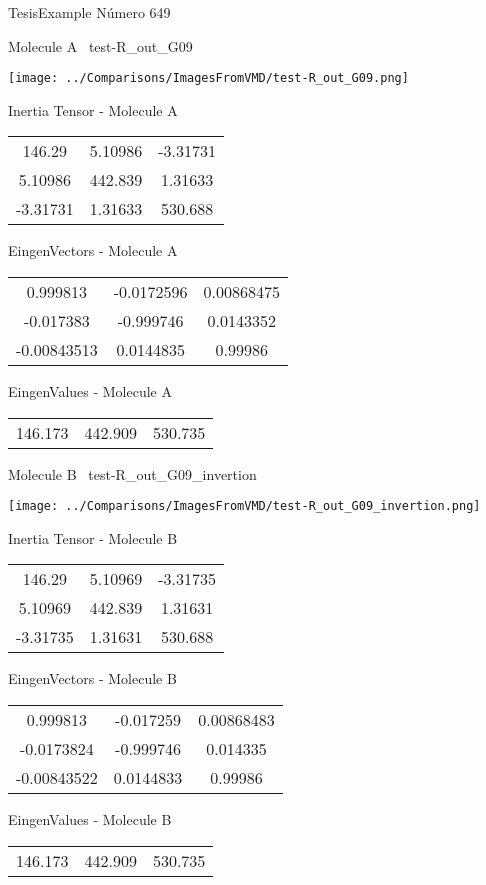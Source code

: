 \vtab[-3cm]
\begin{center}
{\large TesisExample \tab Número 649}
\end{center}
\begin{multicols}{2}
\begin{center}

Molecule A \
test-R\_out\_G09

\texttt{[image: ../Comparisons/ImagesFromVMD/test-R\_out\_G09.png]}

Inertia Tensor - Molecule A \\
\begin{tabular}{|c c c|}
146.29	 & 	5.10986	 & 	-3.31731	 \\
5.10986	 & 	442.839	 & 	1.31633	 \\
-3.31731	 & 	1.31633	 & 	530.688
\end{tabular}

\vtab
 EingenVectors - Molecule A     \\
\begin{tabular}{|c c c|}
0.999813	 & 	-0.0172596	 & 	0.00868475	 \\
-0.017383	 & 	-0.999746	 & 	0.0143352	 \\
-0.00843513	 & 	0.0144835	 & 	0.99986
\end{tabular}

\vtab
 EingenValues - Molecule A     \\
\begin{tabular}{|c c c|}
146.173	 & 	442.909	 & 	530.735	 \\
\end{tabular}
\columnbreak

Molecule B \
test-R\_out\_G09\_invertion

\texttt{[image: ../Comparisons/ImagesFromVMD/test-R\_out\_G09\_invertion.png]}

Inertia Tensor - Molecule B \\
\begin{tabular}{|c c c|}
146.29	 & 	5.10969	 & 	-3.31735	 \\
5.10969	 & 	442.839	 & 	1.31631	 \\
-3.31735	 & 	1.31631	 & 	530.688
\end{tabular}

\vtab
 EingenVectors - Molecule B     \\
\begin{tabular}{|c c c|}
0.999813	 & 	-0.017259	 & 	0.00868483	 \\
-0.0173824	 & 	-0.999746	 & 	0.014335	 \\
-0.00843522	 & 	0.0144833	 & 	0.99986
\end{tabular}

\vtab
 EingenValues - Molecule B     \\
\begin{tabular}{|c c c|}
146.173	 & 	442.909	 & 	530.735	 \\
\end{tabular}

\end{center}
\end{multicols}

